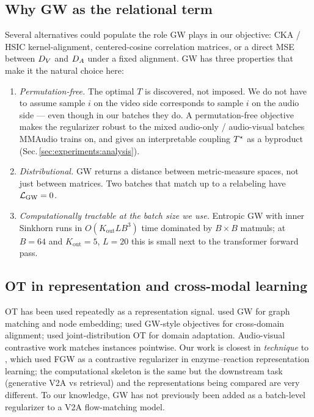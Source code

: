 \subsection{Why GW as the relational term}
Several alternatives could populate the role GW plays in our
objective: CKA / HSIC kernel-alignment, centered-cosine
correlation matrices, or a direct MSE between $D_{V}$ and $D_{A}$
under a fixed alignment. GW has three properties that make it
the natural choice here:
\begin{enumerate}[leftmargin=*]
  \item \emph{Permutation-free.} The optimal $T$ is discovered,
    not imposed. We do not have to assume sample $i$ on the
    video side corresponds to sample $i$ on the audio side ---
    even though in our batches they do. A permutation-free
    objective makes the regularizer robust to the mixed
    audio-only / audio-visual batches MMAudio trains on, and
    gives an interpretable coupling $T^{\star}$ as a byproduct
    (Sec.\,\ref{sec:experiments:analysis}).
  \item \emph{Distributional.} GW returns a distance between
    metric-measure spaces, not just between matrices. Two batches
    that match up to a relabeling have $\mathcal{L}_{\mathrm{GW}} = 0$.
  \item \emph{Computationally tractable at the batch size we
    use.} Entropic GW with inner Sinkhorn runs in
    $O(K_{\text{out}} L B^3)$ time dominated by $B \times B$
    matmuls; at $B = 64$ and $K_{\text{out}} = 5$, $L = 20$ this
    is small next to the transformer forward pass.
\end{enumerate}

\subsection{OT in representation and cross-modal learning}
OT has been used repeatedly as a representation signal.
\citet{xu2020gromov} used GW for graph matching and node
embedding; \citet{chen2020graph} used GW-style objectives for
cross-domain alignment; \citet{courty2017joint} used
joint-distribution OT for domain adaptation. Audio-visual
contrastive work
\citep{morgado2021audiovisual,chen2021localizing,afouras2020self}
matches instances pointwise. Our work is closest in
\emph{technique} to \citet{zhou2025fgwclip}, which used FGW as a
contrastive regularizer in enzyme--reaction representation
learning; the computational skeleton is the same but the
downstream task (generative V2A vs retrieval) and the
representations being compared are very different. To our
knowledge, GW has not previously been added as a batch-level
regularizer to a V2A flow-matching model.

